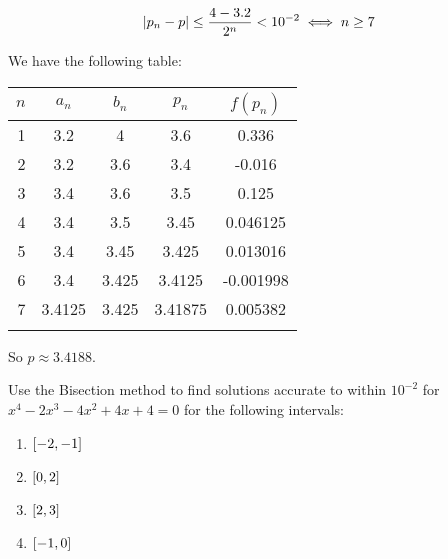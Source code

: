 \documentclass[../../Assignments.tex]{subfiles}
\begin{document}
\begin{solution}
\begin{enumerate}[label=(\alph*)]
            \[\abs{p_n - p} \leq \frac{4 - \num{3.2}}{2^n} < 10^{-2} \iff n \geq 7\]

            We have the following table:

            \begin{tabular}{r S[table-format=1.5] S[table-format=1.6] S[table-format=1.6] S[table-format=-1.6]}
                \\
                \toprule
                \(n\)  &  {\(a_n\)}  &  {\(b_n\)}  &  {\(p_n\)}  &  {\(f(p_n)\)}  \\
                  &  3.2        &  4          &  3.6        &   0.336        \\
                    2  &  3.2        &  3.6        &  3.4        &  -0.016        \\
                    3  &  3.4        &  3.6        &  3.5        &   0.125        \\
                    4  &  3.4        &  3.5        &  3.45       &   0.046125     \\
                    5  &  3.4        &  3.45       &  3.425      &   0.013016     \\
                    6  &  3.4        &  3.425      &  3.4125     &  -0.001998     \\
                    7  &  3.4125     &  3.425      &  3.41875    &   0.005382     \\
                \bottomrule
                \\
            \end{tabular}

            So \(p \approx \num{3.4188}\).
    \end{enumerate}
\end{solution}

\begin{exercise}
    Use the Bisection method to find solutions accurate to within \(10^{-2}\)
    for \(x^4 - 2x^3 - 4x^2 + 4x + 4 = 0\) for the following intervals:

    \begin{enumerate}[label=(\alph*)]
        \item \(\interval{-2}{-1}\)
        \item \(\interval{0}{2}\)
        \item \(\interval{2}{3}\)
        \item \(\interval{-1}{0}\)
    \end{enumerate}
\end{exercise}
\end{document}
